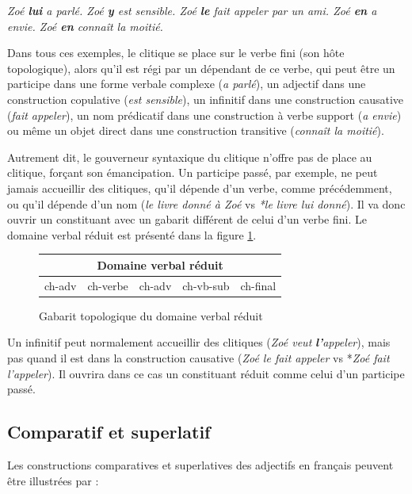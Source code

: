 \ea
\ea \itshape Zoé \textbf{lui} a parlé.
\ex \itshape Zoé \textbf{y}   est sensible.
\ex \itshape Zoé \textbf{le}  fait appeler par un ami.
\ex \itshape Zoé \textbf{en}  a envie.
\ex \itshape Zoé \textbf{en}  connaît la moitié.
\z
\z

Dans tous ces exemples, le clitique se place sur le verbe fini (son hôte topologique), alors qu’il est régi par un dépendant de ce verbe, qui peut être un participe dans une forme verbale complexe (\textit{a parlé}), un adjectif dans une construction copulative (\textit{est sensible}), un infinitif dans une construction causative (\textit{fait appeler}), un nom prédicatif dans une construction à verbe support (\textit{a envie}) ou même un objet direct dans une construction transitive (\textit{connaît la moitié}).

Autrement dit, le gouverneur syntaxique du clitique n’offre pas de place au clitique, forçant son émancipation. Un participe passé, par exemple, ne peut jamais accueillir des clitiques, qu’il dépende d’un verbe, comme précédemment, ou qu’il dépende d’un nom (\textit{le livre donné à Zoé} vs \textit{*le livre lui donné}). Il va donc ouvrir un constituant avec un gabarit différent de celui d’un verbe fini.
Le domaine verbal réduit est présenté dans la figure \ref{fig:gabarit-verbal-reduit}.

\begin{figure}
\caption{\label{fig:gabarit-verbal-reduit}Gabarit topologique du domaine verbal réduit}
\def\arraystretch{1.5}
\setlength{\tabcolsep}{3ex}
\begin{tabular}{|c|c|c|c|c|}
\hline
\multicolumn{5}{|c|}{\cellcolor{lsDOIGray}Domaine verbal réduit}\\
\hline
ch-adv & \cellcolor{lsDOIGray}ch-verbe & ch-adv & ch-vb-sub & ch-final\\
\hline
\end{tabular}
\end{figure}

Un infinitif peut normalement accueillir des clitiques (\textit{Zoé veut} \textbf{\textit{l’}}\textit{appeler}), mais pas quand il est dans la construction causative (\textit{Zoé le fait appeler} vs *\textit{Zoé fait l'appeler}). Il ouvrira dans ce cas un constituant réduit comme celui d’un participe passé.

\subsection{Comparatif et superlatif}
Les constructions comparatives et superlatives des adjectifs en français peuvent être illustrées par :

